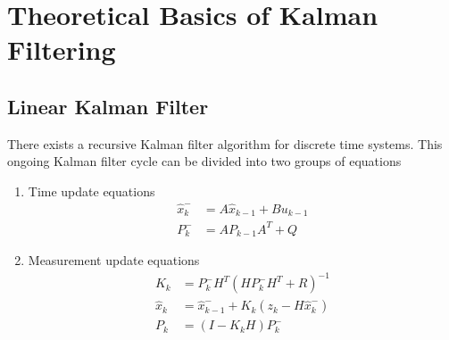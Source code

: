 \chapter{Theoretical Basics of Kalman Filtering}

\section{Linear Kalman Filter}
There exists a recursive Kalman filter algorithm for discrete time systems.\cite{IntroKF} This ongoing Kalman filter cycle can be divided into two groups of equations
\newline
\begin{enumerate}
	\item Time update equations
	\begin{eqnarray}\label{TupEq}
    			\hat{x}_{k}^{-} &= A\hat{x}_{k-1}+Bu_{k-1} \\
    			P_{k}^{-} &= AP_{k-1}A^{T}+Q
	\end{eqnarray}
	\item Measurement update equations
	\begin{eqnarray}\label{MupEq}
    			K_{k} &= P_{k}^{-}H^{T}(HP_{k}^{-}H^{T}+R)^{-1} \\
    			\hat{x}_{k} &= \hat{x}_{k-1}^{-}+K_{k}(z_{k}-H\hat{x}_{k}^{-}) \\
			P_{k} &= (I-K_{k}H)P_{k}^{-}
	\end{eqnarray}
\end{enumerate}

